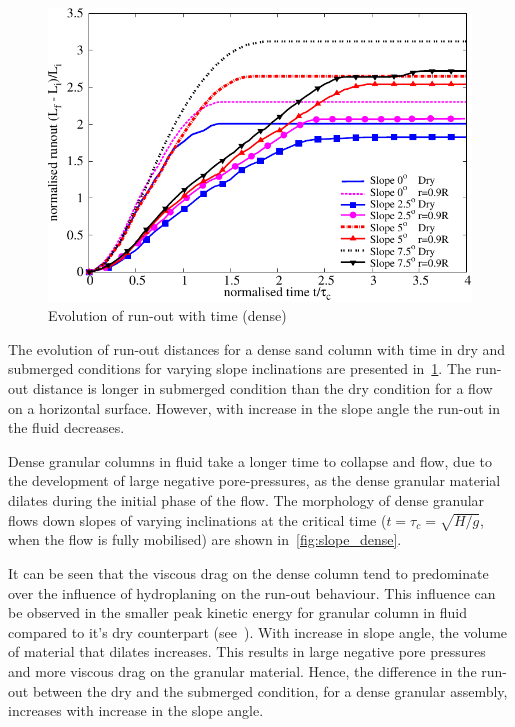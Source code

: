 \begin{figure}
\centering
\includegraphics[width=0.97\columnwidth]{Runout_dense_slope}
\caption{Evolution of run-out with time (dense)}
\label{fig:run_dense}
\end{figure}

The evolution of run-out distances for a dense sand column with time in dry and submerged conditions for varying slope inclinations are presented in~\cref{fig:run_dense}. The run-out distance is longer in submerged condition than the dry condition for a flow on a horizontal surface. However, with increase in the slope angle the run-out in the fluid decreases.

Dense granular columns in fluid take a longer time to collapse and flow, due to the development of large negative pore-pressures, as the dense granular material dilates during the initial phase of the flow. The morphology of dense granular flows down slopes of varying inclinations at the critical time ($t=\tau_{c}=\sqrt{H/g}$, when the flow is fully mobilised) are shown in~\cref{fig:slope_dense}.

It can be seen that the viscous drag on the dense column tend to predominate over the influence of hydroplaning on the run-out behaviour. This influence can be observed in the smaller peak kinetic energy for granular column in fluid compared to it's dry counterpart (see~). With increase in slope angle, the volume of material that dilates increases. This results in large negative pore pressures and more viscous drag on the granular material. Hence, the difference in the run-out between the dry and the submerged condition, for a dense granular assembly, increases with increase in the slope angle.

